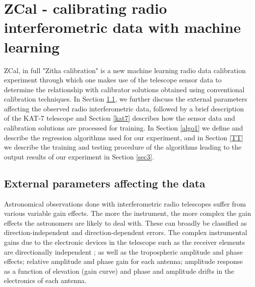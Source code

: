 \chapter{ZCal - calibrating radio interferometric data with machine learning}
\label{c3}
ZCal, in full "Zitha calibration" is a new machine learning radio data calibration experiment through which one makes use of the telescope sensor data to determine the relationship with calibrator solutions obtained using conventional calibration techniques. In Section \ref{Exp}, we further discuss the external parameters affecting the observed radio interferometric data, followed by a brief description of the KAT-7 telescope and  Section \ref{kat7} describes how the sensor data and calibration solutions are processed for training. In Section \ref{algo1} we define and describe the regression algorithms used for our experiment, and in Section \ref{TT} we describe the training and testing procedure of the algorithms leading to the output results of our experiment in Section \ref{sec3}. 
\section{External parameters affecting the data}
\label{Exp}

Astronomical observations done with interferometric radio
telescopes suffer from various variable gain effects. The more the instrument, the more complex the gain effects the astronomers are likely to deal with. These can
broadly be classified as direction-independent and direction-dependent errors. The complex instrumental gains due to the electronic devices in the telescope such as the receiver elements are directionally independent \citep{bhatnagar2008correcting}; as well as the tropospheric amplitude and phase effects; relative amplitude and phase gain for each antenna; amplitude response as a function of elevation (gain curve) and phase and amplitude drifts in the electronics of each antenna\citep{bhatnagar2008correcting}.

